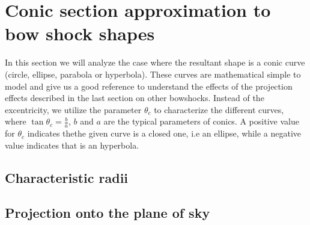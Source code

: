 \section{Conic section approximation to bow shock shapes}
\label{sec:conic}


In this section we will analyze the case where the resultant shape is a conic curve (circle, ellipse, parabola or hyperbola).
These curves are mathematical simple to model and give us a good reference to understand the effects of the projection effects
described in the last section on other bowshocks. Instead of the excentricity, we utilize the parameter $\theta_c$ to characterize the different curves, where
$\tan\theta_c = \frac{b}{a}$,  $b$ and $a$ are the typical parameters of conics. A positive value for $\theta_c$ indicates thethe given curve is a closed one, i.e
an ellipse, while a negative value indicates that is an hyperbola. %


\subsection{Characteristic radii}

\subsection{Projection onto the plane of sky} 

